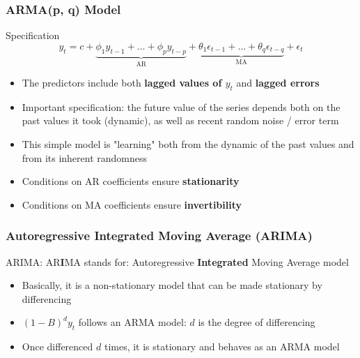 \documentclass{beamer}
\begin{document}
\begin{frame}
  \frametitle{ARMA(p, q) Model}
  \begin{block}{Specification}
    \begin{equation*}
      y_t = c + \underbrace{\phi_1 y_{t-1} + \dots + \phi_p y_{t-p}}_{\text{AR}} + \underbrace{\theta_1 \epsilon_{t-1} + \dots + \theta_q \epsilon_{t-q}}_{\text{MA}} + \epsilon_t
    \end{equation*}
  \end{block}

  \medskip

  \begin{itemize}
  \item The predictors include both \textbf{lagged values of $y_t$} and \textbf{lagged errors}
  \item Important specification: the future value of the series depends both on the past values it took (dynamic), as well as recent random noise / error term 
  \item This simple model is "learning" both from the dynamic of the past values and from its inherent randomness
  \item Conditions on AR coefficients ensure \textbf{stationarity}
  \item Conditions on MA coefficients ensure \textbf{invertibility}
  \end{itemize}
  
\end{frame}

\begin{frame}
  \frametitle{Autoregressive Integrated Moving Average (ARIMA)}

  ARIMA: AR\textbf{I}MA stands for: Autoregressive \textbf{Integrated} Moving Average model

  \begin{itemize}
  \item Basically, it is a non-stationary model that can be made stationary by differencing
  \item $(1-B)^d y_t$ follows an ARMA model: $d$ is the degree of differencing
  \item Once differenced $d$ times, it is stationary and behaves as an ARMA model
  \end{itemize}  
\end{frame}
\end{document}

